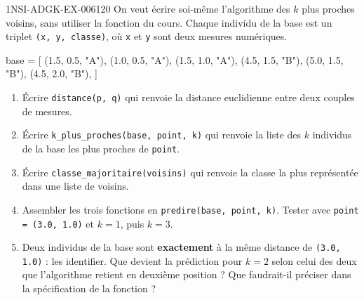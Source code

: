 \begin{exercice}{1NSI-ADGK-EX-006}{1}{20}
On veut écrire soi-même l'algorithme des $k$ plus proches voisins, sans utiliser
la fonction du cours. Chaque individu de la base est un triplet
\lstinline{(x, y, classe)}, où \lstinline{x} et \lstinline{y} sont deux mesures
numériques.
\begin{python}
base = [
    (1.5, 0.5, "A"), (1.0, 0.5, "A"), (1.5, 1.0, "A"),
    (4.5, 1.5, "B"), (5.0, 1.5, "B"), (4.5, 2.0, "B"),
]
\end{python}
\begin{enumerate}
  \item Écrire \lstinline{distance(p, q)} qui renvoie la distance euclidienne
    entre deux couples de mesures.
  \item Écrire \lstinline{k_plus_proches(base, point, k)} qui renvoie la liste
    des $k$ individus de la base les plus proches de \lstinline{point}.
  \item Écrire \lstinline{classe_majoritaire(voisins)} qui renvoie la classe la
    plus représentée dans une liste de voisins.
  \item Assembler les trois fonctions en \lstinline{predire(base, point, k)}.
    Tester avec \lstinline{point = (3.0, 1.0)} et $k=1$, puis $k=3$.
  \item Deux individus de la base sont \textbf{exactement} à la même distance de
    \lstinline{(3.0, 1.0)} : les identifier. Que devient la prédiction pour
    $k=2$ selon celui des deux que l'algorithme retient en deuxième position ?
    Que faudrait-il préciser dans la spécification de la fonction ?
\end{enumerate}
\end{exercice}
